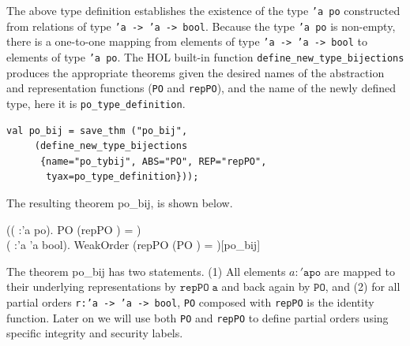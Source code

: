 The above type definition establishes the existence of the type
\texttt{'a po} constructed from relations of type \texttt{'a -> 'a ->
  bool}. Because the type \texttt{'a po} is non-empty, there is a
one-to-one mapping from elements of type \texttt{'a -> 'a -> bool} to
elements of type \texttt{'a po}. The HOL built-in function
\texttt{define\_new\_type\_bijections} produces the appropriate
theorems given the desired names of the abstraction and representation
functions (\texttt{PO} and \texttt{repPO}), and the name of the newly
defined type, here it is \texttt{po\_type\_definition}.

\begin{session}
\begin{verbatim}
val po_bij = save_thm ("po_bij",
     (define_new_type_bijections
      {name="po_tybij", ABS="PO", REP="repPO", 
       tyax=po_type_definition}));
\end{verbatim}
\end{session}

The resulting theorem po\_bij, is shown below.

\HOLTokenTurnstile{} (\HOLTokenForall{}( :'a po). PO
(repPO ) = )
\HOLTokenConj{}\\\hspace*{0.35in} \HOLTokenForall{}(
:'a \HOLTokenMap{} 'a \HOLTokenMap{} bool). WeakOrder 
\HOLTokenEquiv{} (repPO (PO ) =
)\hfill{[po\_bij]}

The theorem po\_bij has two statements. (1) All elements $a:\mathtt{'a
  po}$ are mapped to their underlying representations by
$\mathtt{repPO\; a}$ and back again by $\mathtt{PO}$, and (2) for all
partial orders \texttt{r:'a -> 'a -> bool}, \texttt{PO} composed with
\texttt{repPO} is the identity function. Later on we will use both
\texttt{PO} and \texttt{repPO} to define partial orders using specific
integrity and security labels.


